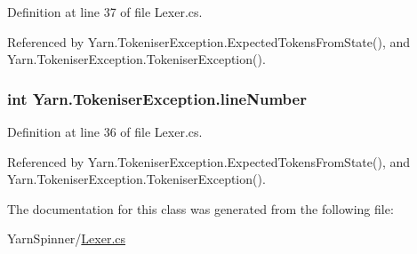 Definition at line 37 of file Lexer.\-cs.



Referenced by Yarn.\-Tokeniser\-Exception.\-Expected\-Tokens\-From\-State(), and Yarn.\-Tokeniser\-Exception.\-Tokeniser\-Exception().

\hypertarget{a00174_a54b936d7b4f26f88a07a66c5fc1d1ad1}{
\subsubsection[{line\-Number}]{\setlength{\rightskip}{0pt plus 5cm}int Yarn.\-Tokeniser\-Exception.\-line\-Number}}\label{a00174_a54b936d7b4f26f88a07a66c5fc1d1ad1}


Definition at line 36 of file Lexer.\-cs.



Referenced by Yarn.\-Tokeniser\-Exception.\-Expected\-Tokens\-From\-State(), and Yarn.\-Tokeniser\-Exception.\-Tokeniser\-Exception().



The documentation for this class was generated from the following file\-:\begin{DoxyCompactItemize}
\item 
Yarn\-Spinner/\hyperlink{a00310}{Lexer.\-cs}\end{DoxyCompactItemize}
